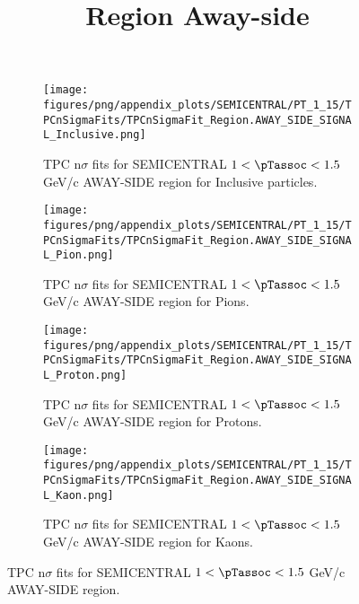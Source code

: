             \begin{figure}[H]
                \title{Region Away-side}
                \begin{subfigure}[b]{0.5\textwidth}
                    \centering
                    \texttt{[image: figures/png/appendix\_plots/SEMICENTRAL/PT\_1\_15/TPCnSigmaFits/TPCnSigmaFit\_Region.AWAY\_SIDE\_SIGNAL\_Inclusive.png]}
                    \caption{TPC n$\sigma$ fits for SEMICENTRAL $1 < \pTassoc < 1.5$ GeV/c AWAY-SIDE region for Inclusive particles.}
                    \label{fig:appendix_SEMICENTRAL_$1 < \pTassoc < 1.5$ GeV/c_AWAY_SIDE_SIGNAL_Inclusive}
                \end{subfigure}
                \begin{subfigure}[b]{0.5\textwidth}
                    \centering
                    \texttt{[image: figures/png/appendix\_plots/SEMICENTRAL/PT\_1\_15/TPCnSigmaFits/TPCnSigmaFit\_Region.AWAY\_SIDE\_SIGNAL\_Pion.png]}
                    \caption{TPC n$\sigma$ fits for SEMICENTRAL $1 < \pTassoc < 1.5$ GeV/c AWAY-SIDE region for Pions.}
                    \label{fig:appendix_SEMICENTRAL_$1 < \pTassoc < 1.5$ GeV/c_AWAY_SIDE_SIGNAL_Pion}
                \end{subfigure}
                \begin{subfigure}[b]{0.5\textwidth}
                    \centering
                    \texttt{[image: figures/png/appendix\_plots/SEMICENTRAL/PT\_1\_15/TPCnSigmaFits/TPCnSigmaFit\_Region.AWAY\_SIDE\_SIGNAL\_Proton.png]}
                    \caption{TPC n$\sigma$ fits for SEMICENTRAL $1 < \pTassoc < 1.5$ GeV/c AWAY-SIDE region for Protons.}
                    \label{fig:appendix_SEMICENTRAL_$1 < \pTassoc < 1.5$ GeV/c_AWAY_SIDE_SIGNAL_Proton}
                \end{subfigure}
                \begin{subfigure}[b]{0.5\textwidth}
                    \centering
                    \texttt{[image: figures/png/appendix\_plots/SEMICENTRAL/PT\_1\_15/TPCnSigmaFits/TPCnSigmaFit\_Region.AWAY\_SIDE\_SIGNAL\_Kaon.png]}
                    \caption{TPC n$\sigma$ fits for SEMICENTRAL $1 < \pTassoc < 1.5$ GeV/c AWAY-SIDE region for Kaons.}
                    \label{fig:appendix_SEMICENTRAL_$1 < \pTassoc < 1.5$ GeV/c_AWAY_SIDE_SIGNAL_Kaon}
                \end{subfigure}
                \caption{TPC n$\sigma$ fits for SEMICENTRAL $1 < \pTassoc < 1.5$ GeV/c AWAY-SIDE region.}
                \label{fig:appendix_SEMICENTRAL_$1 < \pTassoc < 1.5$ GeV/c_AWAY_SIDE_SIGNAL}
            \end{figure}
